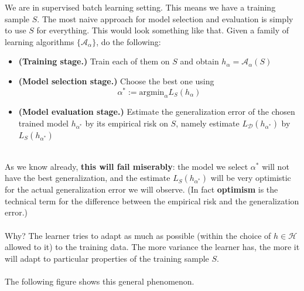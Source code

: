 \documentclass[11pt]{article}
\newcommand{\Ac}{\mathcal{A}}
\newcommand{\Dc}{\mathcal{D}}
\newcommand{\Hc}{\mathcal{H}}
\begin{document}
We are in supervised batch learning setting. This means we have a training
sample $S$. The most naive approach for model selection and evaluation is simply
to use $S$ for everything. This would look something like that. Given a family
of learning algorithms $\{\Ac_\alpha\}$, do the following:
\begin{itemize}
  \item {\bf (Training stage.)} Train each of them on $S$ and obtain $h_\alpha=\Ac_\alpha(S)$
  \item {\bf (Model selection stage.)} Choose the best one using 
    \[
      \alpha^* := \text{argmin}_\alpha L_S(h_\alpha)
    \]
  \item {\bf (Model evaluation stage.)} 
    Estimate the generalization error of the chosen trained model $h_{\alpha^*}$
    by
    its empirical risk on $S$, namely estimate $L_\Dc(h_{\alpha^*})$ by
    $L_S(h_{\alpha^*})$
    
\end{itemize}
~\\
As we know already, {\bf this will fail miserably}: the model we select $\alpha^*$
will not have the best generalization, and the estimate 
$L_S(h_{\alpha^*})$ will be very optimistic for the actual generalization error
we will observe. (In fact {\bf optimism} is the technical term for the difference
between the empirical risk and the generalization error.)
\\~\\
Why? The learner tries to adapt as much as possible (within the choice of
$h\in\Hc$ allowed to it) to the training data. The more variance the learner
has, the more it will adapt to particular properties of the training sample $S$.
\\~\\
The following figure shows this general phenomenon.
\end{document}
